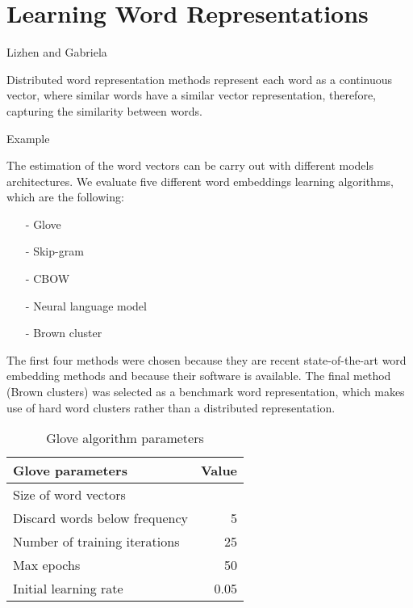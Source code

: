 
\section{Learning Word Representations}
{\color{red}Lizhen and Gabriela}


Distributed word representation methods represent each word as a continuous vector, where similar words have a similar vector representation, therefore, capturing
the similarity between words.

{\color{blue}Example}

The estimation of the word vectors can be carry out with different models architectures. We evaluate five different word embeddings learning algorithms, which are the following: 
 
\begin{itemize}
\item[-] Glove \cite{pennington2014glove}
\item[-] Skip-gram \cite{Mikolov13}
\item[-] CBOW \cite{Mikolov13}
\item[-] Neural language model \cite{collobert2011natural}
\item[-] Brown cluster \cite{Brown92class-basedn-gram}
\end{itemize}

The first four methods were chosen because they are recent
state-of-the-art word embedding methods and because their software is
available. The final method (Brown clusters) was selected as a benchmark word representation, which makes use of hard word clusters rather than a distributed representation.

\begin{table}
\centering
\begin{small}
\begin{tabular}{lr}
\hline
\textbf{Glove parameters}  & \textbf{Value} \\ \hline
Size of word vectors &  \\
Discard words below frequency & 5 \\
Number of training iterations & 25 \\
Max epochs & 50 \\
Initial learning rate & 0.05\\ \hline
\end{tabular}
\label{glove}
\caption{Glove algorithm parameters}
\end{small}
\end{table}


